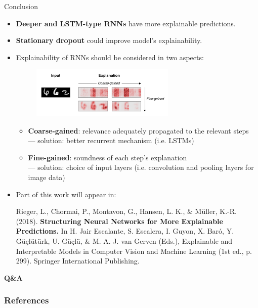 \documentclass[Nike]{tuberlinbeamer}
\begin{document}
\begin{frame}[allowframebreaks=0.99,t]{Conclusion}

\begin{itemize}
	\item \textbf{Deeper and LSTM-type RNNs} have more explainable predictions.
	\item \textbf{Stationary dropout} could improve model's explainability.
	\item Explainability of RNNs should be considered in two aspects:
	 \begin{figure}[h]
	\includegraphics [width=0.65\textwidth]{figures/present_coarse_fine_aspects}
\end{figure}
		\begin{itemize}
			\item \textbf{Coarse-gained}: relevance adequately propagated to the relevant steps \\
					--- solution: better recurrent mechanism (i.e. LSTMs)
			\item \textbf{Fine-gained}: soundness of each step's explanation\\
					--- solution: choice of input layers (i.e. convolution and pooling layers for image data)
		\end{itemize}

\framebreak

	\item Part of this work will appear in: \\
{ \small \vspace{0.2cm}
Rieger, L., Chormai, P., Montavon, G., Hansen, L. K., \& Müller, K.-R. (2018). \textbf{Structuring Neural Networks for More Explainable Predictions.} In H. Jair Escalante, S. Escalera, I. Guyon, X. Baró, Y. Güçlütürk, U. Güçlü, \& M. A. J. van Gerven (Eds.), Explainable and Interpretable Models in Computer Vision and Machine Learning (1st ed., p. 299). Springer International Publishing.

}

\end{itemize}
\end{frame}


\begin{frame}{}
\vfill \centering
\LARGE \textbf{Q\&A}
\vfill
\end{frame}

\begin{frame}[allowframebreaks]
        \frametitle{References}
        
        
\end{frame}
\end{document}
